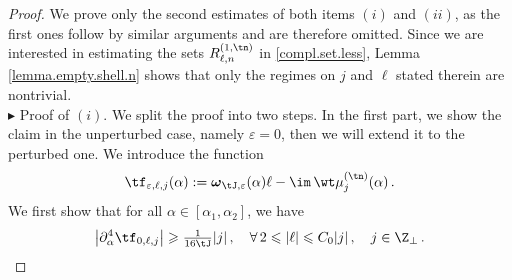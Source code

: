 \documentclass[a4paper,reqno,10pt]{article}
\newcommand{\pa}{\partial}
\newcommand{\bomega}{{\boldsymbol{\omega}}}
\begin{document}
\begin{proof}
We prove only the second estimates of both items $(i)$ and $(ii)$, as the first ones follow by similar arguments and are therefore omitted. Since we are interested in estimating the sets $ R_{\ell,n}^{(1,\tn)} $ in \eqref{compl.set.less}, Lemma \ref{lemma.empty.shell.n} shows that only the regimes on $j$ and $\ell$ stated therein are nontrivial.
\\[1mm]
\noindent $\blacktriangleright$ {\sc Proof of $(i)$.}
	We split the proof into two steps. In the first part, we show the claim in the unperturbed case, namely $\varepsilon=0$, then we will extend it to the perturbed one.
     We introduce the function
\begin{equation}\label{fj-alpha}
     \tf_{\varepsilon,\ell,j}(\alpha) := \bomega_{\tJ,\varepsilon}(\alpha) \ell -\im \, \wt\mu_{j}^{(\tn)}(\alpha) \,.
	\end{equation}
We first show that for all $\alpha\in [\alpha_{1},\alpha_{2}]$, we have
    \begin{equation}\label{transv.unpert}
        \big| \pa_{\alpha}^4 \tf_{0,\ell,j} \big| \geqslant \tfrac{1}{16\tJ}  |j|
		\,, \quad \forall\, 2\leqslant |\ell|\leqslant C_0 |j|\,, \quad j \in \Z_{\perp} \,. 
	\end{equation}

\end{proof}
\end{document}
